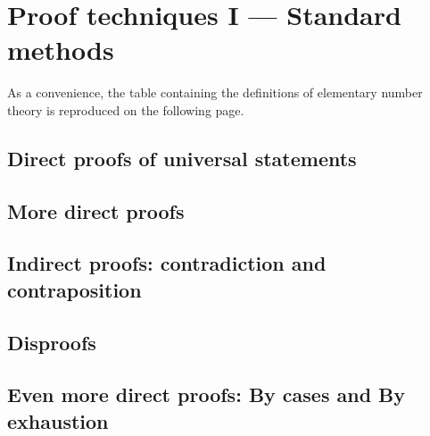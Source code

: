 

\chapter[Proof techniques I]{Proof techniques I --- Standard methods}

As a convenience, the table containing the definitions of elementary number theory is reproduced on the following page.



\clearpage 

\section{Direct proofs of universal statements}









\newpage
\section{More direct proofs}





\newpage

\section[Contradiction and contraposition]{Indirect proofs: contradiction and contraposition}




\newpage

\section{Disproofs}





\newpage

\section[By cases and By exhaustion]{Even more direct proofs: By cases and By exhaustion}


